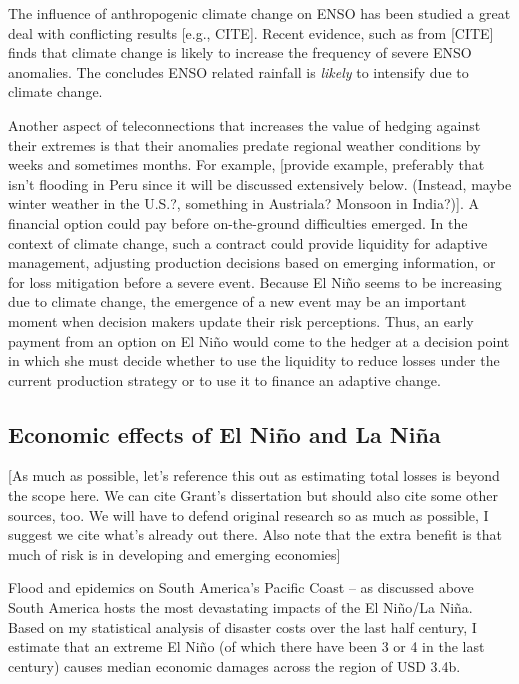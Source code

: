 \documentclass[authoryear]{article}
\begin{document}
The influence of anthropogenic climate change on ENSO has been studied a great deal with conflicting results [e.g., CITE]. Recent evidence, such as from [CITE] finds that climate change is likely to increase the frequency of severe ENSO anomalies. The \citet{ipcc2013fifthReport} concludes ENSO related rainfall is \emph{likely} to intensify due to climate change.

Another aspect of teleconnections that increases the value of hedging against their extremes is that their anomalies predate regional weather conditions by weeks and sometimes months. For example, [provide example, preferably that isn't flooding in Peru since it will be discussed extensively below. (Instead, maybe winter weather in the U.S.?, something in Austriala? Monsoon in India?)]. A financial option could pay before on-the-ground difficulties emerged. In the context of climate change, such a contract could provide liquidity for adaptive management, adjusting production decisions based on emerging information, or for loss mitigation before a severe event. Because El Ni\~no seems to be increasing due to climate change, the emergence of a new event may be an important moment when decision makers update their risk perceptions. Thus, an early payment from an option on El Ni\~no would come to the hedger at a decision point in which she must decide whether to use the liquidity to reduce losses under the current production strategy or to use it to finance an adaptive change.

\subsection{Economic effects of El Ni\~no and La Ni\~na}
[As much as possible, let's reference this out as estimating total losses is beyond the scope here. We can cite Grant's dissertation but should also cite some other sources, too. We will have to defend original research so as much as possible, I suggest we cite what's already out there. Also note that the extra benefit is that much of risk is in developing and emerging economies]

Flood and epidemics on South America's Pacific Coast – as discussed above South America hosts the most devastating impacts of the El Ni\~no/La Ni\~na. Based on my statistical analysis of disaster costs over the last half century, I estimate that an extreme El Ni\~no (of which there have been 3 or 4 in the last century) causes median economic damages across the region of USD 3.4b.
\end{document}
